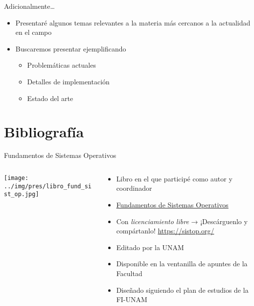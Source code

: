 \documentclass[presentation]{beamer}
\begin{document}
\begin{frame}[label={sec:orgfb7f140}]{Adicionalmente\ldots{}}
\begin{itemize}
\item Presentaré algunos temas relevantes a la materia más cercanos a la
actualidad en el campo
\item Buscaremos presentar ejemplificando
\begin{itemize}
\item Problemáticas actuales
\item Detalles de implementación
\item Estado del arte
\end{itemize}
\end{itemize}
\end{frame}

\section{Bibliografía}
\label{sec:org07eaf85}

\begin{frame}[label={sec:orgdfa68e9}]{Fundamentos de Sistemas Operativos}
\begin{columns}\begin{column}{0.35\textwidth}
\begin{center}
\texttt{[image: ../img/pres/libro\_fund\_sist\_op.jpg]}
\end{center}
\end{column}\begin{column}{0.6\textwidth}
\begin{itemize}
\item Libro en el que participé como autor y coordinador
\item \href{http://sistop.org}{Fundamentos de Sistemas Operativos}
\item Con \emph{licenciamiento libre} → ¡Descárguenlo y compártanlo!
\url{https://sistop.org/}
\item Editado por la UNAM
\item Disponible en la ventanilla de apuntes de la Facultad
\item Diseñado siguiendo el plan de estudios de la FI-UNAM
\end{itemize}
\end{column}\end{columns}
\end{frame}
\end{document}

